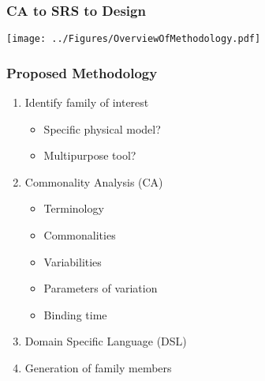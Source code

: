 \documentclass[t,12pt,numbers,fleqn]{beamer}
\begin{document}

\begin{frame}

\frametitle{CA to SRS to Design}

\begin{center}
\texttt{[image: ../Figures/OverviewOfMethodology.pdf]}
\end{center}


\end{frame}


\begin{frame}

\frametitle{Proposed Methodology}

\begin{enumerate}

\item Identify family of interest
\begin{itemize}
\item Specific physical model?
\item Multipurpose tool?
\end{itemize}
\item Commonality Analysis (CA)
\begin{itemize}
\item Terminology
\item Commonalities
\item Variabilities
\item Parameters of variation
\item Binding time
\end{itemize}
\item Domain Specific Language (DSL)
\item Generation of family members

\end{enumerate}

\end{frame}

\end{document}
